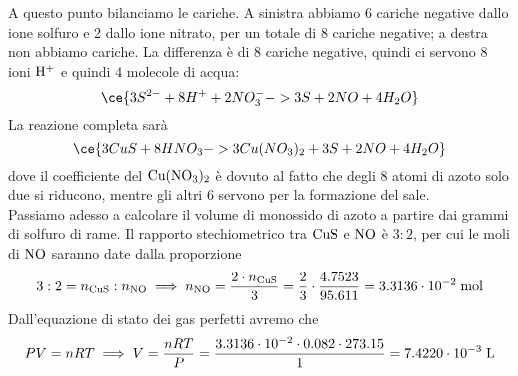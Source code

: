 \begin{soluzione}
\begin{equation*}
    \end{equation*}
    A questo punto bilanciamo le cariche. A sinistra abbiamo 6 cariche negative dallo ione solfuro e 2 dallo ione nitrato, per un totale di 8 cariche negative; a destra non abbiamo cariche. La differenza è di 8 cariche negative, quindi ci servono 8 ioni $\rm H^+$ e quindi 4 molecole di acqua:
    \begin{equation*}
        \ce{3S^{2-} + 8H^+ + 2NO_3^- -> 3S + 2NO + 4H_2O}
    \end{equation*}
    La reazione completa sarà
    \begin{equation*}
        \ce{3CuS + 8HNO_3 -> 3Cu(NO_3)_2 + 3S + 2NO + 4H_2O }
    \end{equation*}
    dove il coefficiente del $\rm Cu(NO_3)_2$ è dovuto al fatto che degli 8 atomi di azoto solo due si riducono, mentre gli altri 6 servono per la formazione del sale.\\
    Passiamo adesso a calcolare il volume di monossido di azoto a partire dai grammi di solfuro di rame. Il rapporto stechiometrico tra $\rm CuS$ e $\rm NO$ è $3:2$, per cui le moli di $\rm NO$ saranno date dalla proporzione
    \begin{equation*}
        3:2=n_{\rm CuS}:n_{\rm NO}
        \implies
        n_{\rm NO}=\frac{2 \cdot n_{\rm CuS}}{3}
        =\frac{2}{3} \cdot \frac{4.7523}{95.611}
        =3.3136 \cdot 10^{-2} \; \rm mol
    \end{equation*}
    Dall'equazione di stato dei gas perfetti avremo che
    \begin{equation*}
        PV=nRT
        \implies
        V=\frac{nRT}{P}
        =\frac{3.3136 \cdot 10^{-2} \cdot 0.082 \cdot 273.15}{1}
        =7.4220 \cdot 10^{-3} \; \rm L
    \end{equation*}
\end{soluzione}